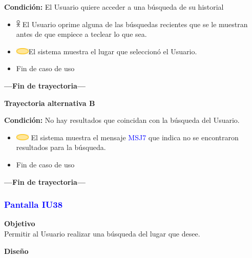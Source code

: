 \textbf{Condición:} El Usuario quiere acceder a una búsqueda de su historial
\begin{itemize}
    \item \includegraphics[width=0.0150\textwidth]{Figuras/persona.png} El Usuario oprime alguna de las búsquedas recientes que se le muestran antes de que empiece a teclear lo que sea.
    \item \includegraphics[width=0.0500\textwidth]{Figuras/sistema.png}El sistema muestra el lugar que seleccionó el Usuario.
    \item Fin de caso de uso
\end{itemize}
\textbf{---Fin de trayectoria---}
\vspace{15pt}

\textbf{Trayectoria alternativa B}
\vspace{10pt}

\textbf{Condición:} No hay resultados que coincidan con la búsqueda del Usuario.
\begin{itemize}
    \item \includegraphics[width=0.0500\textwidth]{Figuras/sistema.png} El sistema muestra el mensaje \textcolor{blue}{MSJ7} que indica no se encontraron resultados para la búsqueda.
    \item Fin de caso de uso
\end{itemize}
\textbf{---Fin de trayectoria---}

\subsubsection{\textcolor{blue}{Pantalla IU38}}

\textbf{Objetivo} \\
Permitir al Usuario realizar una búsqueda del lugar que desee.
\vspace{15pt}

\textbf{Diseño}


